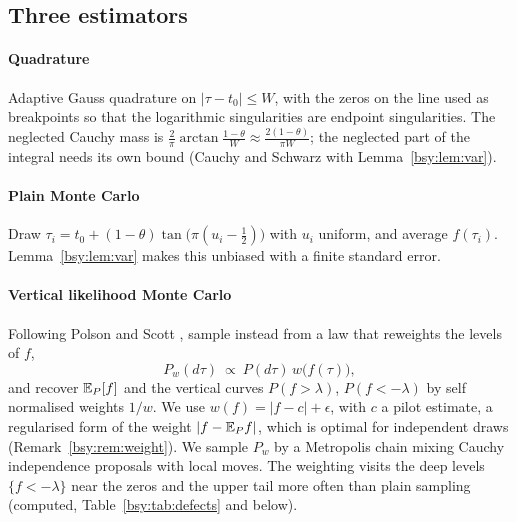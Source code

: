 \subsection{Three estimators}

\paragraph{Quadrature} Adaptive Gauss quadrature on $|\tau-t_0|\le W$, with the zeros on the line used as breakpoints so that the logarithmic singularities are endpoint singularities. The neglected Cauchy mass is $\frac2\pi\arctan\frac{1-\theta}W\approx\frac{2(1-\theta)}{\pi W}$; the neglected part of the integral needs its own bound (Cauchy and Schwarz with Lemma~\ref{bsy:lem:var}).

\paragraph{Plain Monte Carlo} Draw $\tau_i=t_0+(1-\theta)\tan\bigl(\pi(u_i-\frac12)\bigr)$ with $u_i$ uniform, and average $f(\tau_i)$. Lemma~\ref{bsy:lem:var} makes this unbiased with a finite standard error.

\paragraph{Vertical likelihood Monte Carlo} Following Polson and Scott \cite{VLMC14}, sample instead from a law that reweights the levels of $f$,
\[
P_w(d\tau)\ \propto\ P(d\tau)\,w\bigl(f(\tau)\bigr),
\]
and recover $\mathbb{E}_P[f]$ and the vertical curves $P(f>\lambda)$, $P(f<-\lambda)$ by self normalised weights $1/w$. We use $w(f)=|f-c|+\epsilon$, with $c$ a pilot estimate, a regularised form of the weight $|f-\mathbb{E}_Pf|$, which is optimal for independent draws (Remark~\ref{bsy:rem:weight}). We sample $P_w$ by a Metropolis chain mixing Cauchy independence proposals with local moves. The weighting visits the deep levels $\{f<-\lambda\}$ near the zeros and the upper tail more often than plain sampling (computed, Table~\ref{bsy:tab:defects} and below).

